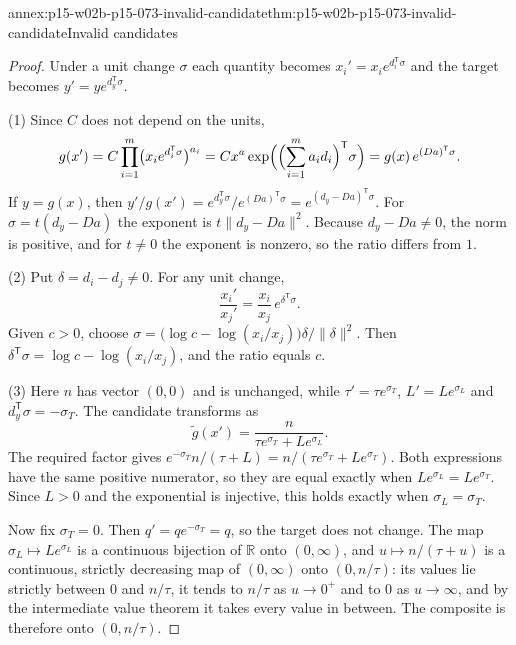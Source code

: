 \begin{annexitem}{annex:p15-w02b-p15-073-invalid-candidate}{thm:p15-w02b-p15-073-invalid-candidate}{Invalid candidates}
\begin{proof}
Under a unit change \(\sigma\) each quantity becomes
\(x_i'=x_ie^{d_i^{\mathsf T}\sigma}\) and the target becomes
\(y'=ye^{d_y^{\mathsf T}\sigma}\).

(1) Since \(C\) does not depend on the units,
\[
 g(x')=C\prod_{i=1}^m\bigl(x_ie^{d_i^{\mathsf T}\sigma}\bigr)^{a_i}
 =Cx^a\exp\Bigl(\Bigl(\sum_{i=1}^m a_id_i\Bigr)^{\mathsf T}\sigma\Bigr)
 =g(x)\,e^{(Da)^{\mathsf T}\sigma}.
\]
If \(y=g(x)\), then
\(y'/g(x')=e^{d_y^{\mathsf T}\sigma}/e^{(Da)^{\mathsf T}\sigma}
=e^{(d_y-Da)^{\mathsf T}\sigma}\). For \(\sigma=t(d_y-Da)\) the exponent is
\(t\lVert d_y-Da\rVert^2\). Because \(d_y-Da\neq0\), the norm is positive, and
for \(t\neq0\) the exponent is nonzero, so the ratio differs from \(1\).

(2) Put \(\delta=d_i-d_j\neq0\). For any unit change,
\[
 \frac{x_i'}{x_j'}=\frac{x_i}{x_j}\,e^{\delta^{\mathsf T}\sigma}.
\]
Given \(c>0\), choose
\(\sigma=\bigl(\log c-\log(x_i/x_j)\bigr)\delta/\lVert\delta\rVert^2\). Then
\(\delta^{\mathsf T}\sigma=\log c-\log(x_i/x_j)\), and the ratio equals \(c\).

(3) Here \(n\) has vector \((0,0)\) and is unchanged, while
\(\tau'=\tau e^{\sigma_T}\), \(L'=Le^{\sigma_L}\) and
\(d_y^{\mathsf T}\sigma=-\sigma_T\). The candidate transforms as
\[
 \tilde g(x')=\frac{n}{\tau e^{\sigma_T}+Le^{\sigma_L}} .
\]
The required factor gives \(e^{-\sigma_T}n/(\tau+L)=n/(\tau e^{\sigma_T}+Le^{\sigma_T})\).
Both expressions have the same positive numerator, so they are equal exactly
when \(Le^{\sigma_L}=Le^{\sigma_T}\). Since \(L>0\) and the exponential is
injective, this holds exactly when \(\sigma_L=\sigma_T\).

Now fix \(\sigma_T=0\). Then \(q'=qe^{-\sigma_T}=q\), so the target does not
change. The map \(\sigma_L\mapsto Le^{\sigma_L}\) is a continuous bijection of
\(\mathbb R\) onto \((0,\infty)\), and \(u\mapsto n/(\tau+u)\) is a continuous,
strictly decreasing map of \((0,\infty)\) onto \((0,n/\tau)\): its values lie
strictly between \(0\) and \(n/\tau\), it tends to \(n/\tau\) as \(u\to0^+\)
and to \(0\) as \(u\to\infty\), and by the intermediate value theorem it
takes every value in between. The composite is therefore onto
\((0,n/\tau)\).
\end{proof}
\end{annexitem}
